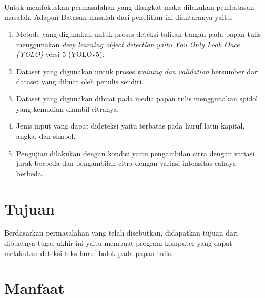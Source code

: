 Untuk memfokuskan permasalahan yang diangkat maka dilakukan pembatasan masalah. Adapun Batasan masalah dari penelitian ini diantaranya yaitu:
\begin{enumerate}[nolistsep]
    \item Metode yang digunakan untuk proses deteksi tulisan tangan pada papan tulis menggunakan \textit{deep learning object detection \textnormal{yaitu} You Only Look Once (YOLO)} versi 5 (YOLOv5).
    \item Dataset yang digunakan untuk proses \textit{training \textnormal{dan} validation} bersumber dari dataset yang dibuat oleh penulis sendiri.
    \item Dataset yang digunakan dibuat pada media papan tulis menggunakan spidol yang kemudian diambil citranya.
    \item Jenis input yang dapat dideteksi yaitu terbatas pada huruf latin kapital, angka, dan simbol.
    \item Pengujian dilakukan dengan kondisi yaitu pengambilan citra dengan variasi jarak berbeda dan pengambilan citra dengan variasi intensitas cahaya berbeda. 
\end{enumerate} 

\section{Tujuan}
\label{sec:Tujuan}

Berdasarkan permasalahan yang telah disebutkan, didapatkan tujuan dari dibuatnya tugas akhir ini yaitu membuat program komputer yang dapat melakukan deteksi teks huruf balok pada papan tulis.



\section{Manfaat}
\label{sec:manfaat}

